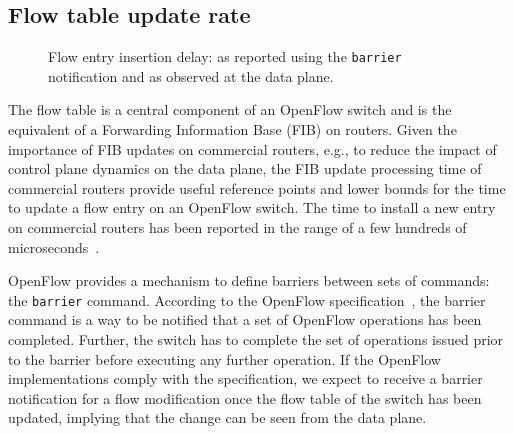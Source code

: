 \subsection{Flow table update rate}\label{sec:results-rate}

% 
\begin{figure}[ht]
  \begin{center}
  \end{center}
  \caption{Flow entry insertion delay: as reported using the
    \texttt{barrier} notification and as observed at the data
    plane.}
  \label{fig:flow_insertion_comparison}
\end{figure}

The flow table is a central component of an OpenFlow switch and is the
equivalent of a Forwarding Information Base (FIB) on routers. Given the
importance of FIB updates on commercial routers, e.g., to reduce the impact of
control plane dynamics on the data plane, the FIB update processing time of
commercial routers provide useful reference points and lower bounds for the time
to update a flow entry on an OpenFlow switch. The time to install a new entry on
commercial routers has been reported in the range of a few hundreds of
microseconds~\cite{shaikh-igp}.

OpenFlow provides a mechanism to define barriers between sets of
commands: the \texttt{barrier} command. According to the OpenFlow
specification~\cite{openflow-spec}, the barrier command is a way to be
notified that a set of OpenFlow operations has been completed. Further, 
the switch has to complete the set of operations issued prior to the barrier 
before executing any further operation. If the OpenFlow implementations 
comply with the specification, we expect to receive a barrier notification for 
a flow modification once the flow table of the switch has been updated, 
implying that the change can be seen from the data plane.

